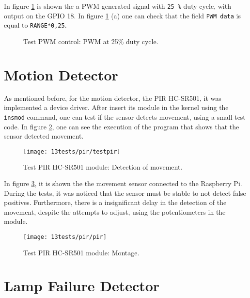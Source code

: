 In figure \ref{fig:pwm_25} is shown the a PWM generated signal with \verb+25 %+ duty cycle, with output on the GPIO 18. In figure \ref{fig:pwm_25} (a) one can check that the field \verb|PWM data| is equal to \verb+RANGE*0,25+.

\begin{figure}[H]%
	\centering
	\qquad
	\caption{Test PWM control: PWM at 25\% duty cycle.}%
	\label{fig:pwm_25}%
\end{figure}

\section{Motion Detector}

As mentioned before, for the motion detector, the PIR HC-SR501, it was implemented a device driver. After insert its module in the kernel using the \verb|insmod| command, one can test if the sensor detects movement, using a small test code. In figure \ref{fig:testpir}, one can see the execution of the program that shows that the sensor detected movement.

\begin{figure}[H]
	\centering	
	\texttt{[image: 13tests/pir/testpir]}
	\caption{Test PIR HC-SR501 module: Detection of movement.}
	\label{fig:testpir}
\end{figure}

In figure \ref{fig:pirMount}, it is shown the the movement sensor connected to the Raspberry Pi. During the tests, it was noticed that the sensor must be stable to not detect false positives. Furthermore, there is a insignificant delay in the detection of the movement, despite the attempts to adjust, using the potentiometers in the module.

\begin{figure}[H]
	\centering	
	\texttt{[image: 13tests/pir/pir]}
	\caption{Test PIR HC-SR501 module: Montage.}
	\label{fig:pirMount}
\end{figure}

\section{Lamp Failure Detector}

